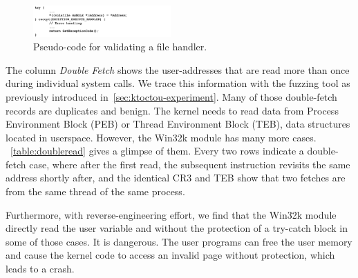 \begin{figure}[th]
  \includegraphics[width=0.47\textwidth]{figures/probecode}
  \centering
  \caption{Pseudo-code for validating a file handler.}
  \label{fig:probecode}
\end{figure}


\vspace*{-10mm}

%
%
%




The column \textit{Double Fetch} shows the user-addresses that are read more than once during individual system calls. We trace this information with the fuzzing tool as previously introduced in~\autoref{sec:ktoctou-experiment}. Many of those double-fetch records are duplicates and benign. The kernel needs to read data from Process Environment Block (PEB) or Thread Environment Block (TEB), data structures located in userspace.  However, the Win32k module has many more cases. ~\autoref{table:doubleread} gives a glimpse of them. Every two rows indicate a double-fetch case, where after the first read, the subsequent instruction revisits the same address shortly after, and the identical CR3 and TEB show that two fetches are from the same thread of the same process.

Furthermore, with reverse-engineering effort, we find that the Win32k module directly read the user variable and without the protection of a try-catch block in some of those cases. It is dangerous. The user programs can free the user memory and cause the kernel code to access an invalid page without protection, which leads to a crash.


